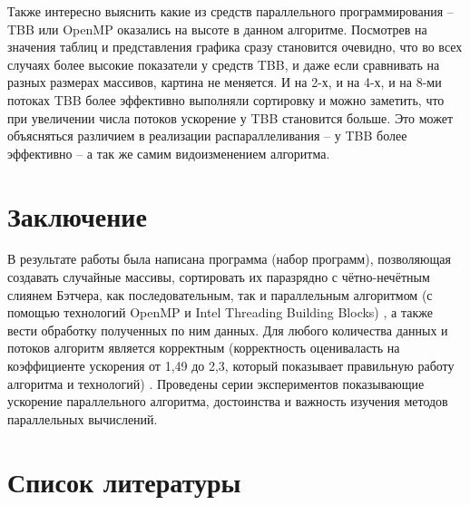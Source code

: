 \documentclass[a4paper,final]{report}
\begin{document}
\begin{spacing}{1.5}
        \par Также интересно выяснить какие из средств параллельного программирования – TBB или OpenMP оказались на высоте в данном алгоритме. Посмотрев на значения таблиц и представления графика сразу становится очевидно, что во всех случаях более высокие показатели у средств TBB, и даже если сравнивать на разных размерах массивов, картина не меняется. И на 2-х, и на 4-х, и на 8-ми потоках TBB более эффективно выполняли сортировку и можно заметить, что при увеличении числа потоков ускорение у TBB становится больше. Это может объясняться  различием в реализации  распараллеливания – у TBB более эффективно – а так же самим видоизменением алгоритма.
		
		\newpage
		
		\section*{\centering Заключение}
		
		\par В результате работы была написана программа (набор программ), позволяющая создавать случайные массивы, сортировать их паразрядно с чётно-нечётным слиянем Бэтчера, как последовательным, так и параллельным алгоритмом (с помощью технологий OpenMP и Intel Threading Building Blocks) , а также вести обработку полученных по ним данных. Для любого количества данных и потоков алгоритм является корректным (корректность оцениваласть на коэффициенте ускорения от 1,49 до 2,3, который показывает правильную работу алгоритма и технологий) . Проведены серии экспериментов показывающие ускорение параллельного алгоритма, достоинства и важность изучения методов параллельных вычислений. 
		
		\newpage
		
		\section*{\centering Список литературы}
		
		\begin{enumerate} 
		

\end{enumerate}
\end{spacing}
\end{document}
